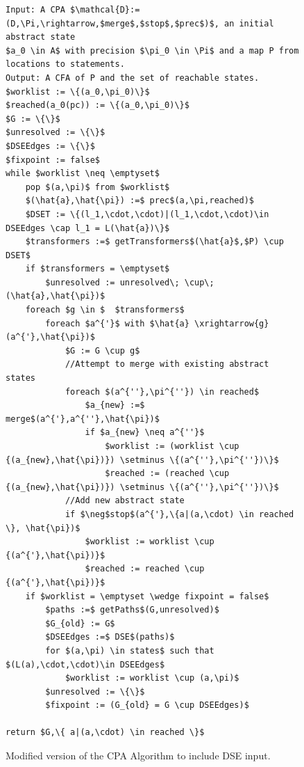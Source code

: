 \documentclass{kththesis}
\begin{document}
\begin{figure}[thb]
    \centering
\begin{lstlisting}[style=algorithm]
Input: A CPA $\mathcal{D}:=(D,\Pi,\rightarrow,$merge$,$stop$,$prec$)$, an initial abstract state
$a_0 \in A$ with precision $\pi_0 \in \Pi$ and a map P from locations to statements.
Output: A CFA of P and the set of reachable states.
$worklist := \{(a_0,\pi_0)\}$
$reached(a_0(pc)) := \{(a_0,\pi_0)\}$
$G := \{\}$
$unresolved := \{\}$
$DSEEdges := \{\}$
$fixpoint := false$
while $worklist \neq \emptyset$ 
    pop $(a,\pi)$ from $worklist$
    $(\hat{a},\hat{\pi}) :=$ prec$(a,\pi,reached)$
    $DSET := \{(l_1,\cdot,\cdot)|(l_1,\cdot,\cdot)\in DSEEdges \cap l_1 = L(\hat{a})\}$
    $transformers :=$ getTransformers$(\hat{a}$,$P) \cup DSET$
    if $transformers = \emptyset$
        $unresolved := unresolved\; \cup\; (\hat{a},\hat{\pi})$
    foreach $g \in $  $transformers$ 
        foreach $a^{'}$ with $\hat{a} \xrightarrow{g} (a^{'},\hat{\pi})$
            $G := G \cup g$
            //Attempt to merge with existing abstract states
            foreach $(a^{''},\pi^{''}) \in reached$
                $a_{new} :=$ merge$(a^{'},a^{''},\hat{\pi})$
                if $a_{new} \neq a^{''}$
                    $worklist := (worklist \cup {(a_{new},\hat{\pi})}) \setminus \{(a^{''},\pi^{''})\}$
                    $reached := (reached \cup {(a_{new},\hat{\pi})}) \setminus \{(a^{''},\pi^{''})\}$
            //Add new abstract state
            if $\neg$stop$(a^{'},\{a|(a,\cdot) \in reached \}, \hat{\pi})$
                $worklist := worklist \cup {(a^{'},\hat{\pi})}$
                $reached := reached \cup {(a^{'},\hat{\pi})}$
    if $worklist = \emptyset \wedge fixpoint = false$
        $paths :=$ getPaths$(G,unresolved)$
        $G_{old} := G$
        $DSEEdges :=$ DSE$(paths)$
        for $(a,\pi) \in states$ such that $(L(a),\cdot,\cdot)\in DSEEdges$
            $worklist := worklist \cup (a,\pi)$
        $unresolved := \{\}$
        $fixpoint := (G_{old} = G \cup DSEEdges)$
            
return $G,\{ a|(a,\cdot) \in reached \}$
\end{lstlisting}
\caption[Modified version of the CPA Algorithm to include DSE input.]{Modified version of the CPA Algorithm to include DSE input.}
    \label{fig:CPAFinal}
\end{figure}

\clearpage

\end{document}
